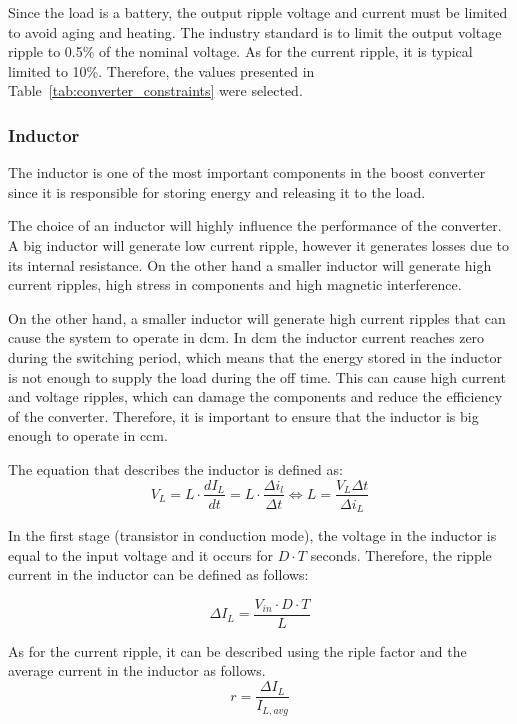 Since the load is a battery, the output ripple voltage and current must be limited to avoid aging and heating. The industry standard is to limit the output voltage ripple to 0.5\% of the nominal voltage. As for the current ripple, it is typical limited to 10\%. Therefore, the values presented in Table~\ref{tab:converter_constraints} were selected.

\subsubsection{Inductor}
The inductor is one of the most important components in the boost converter since it is responsible for storing energy and releasing it to the load. 

The choice of an inductor will highly influence the performance of the converter. A big inductor will generate low current ripple, however it generates losses due to its internal resistance. On the other hand a smaller inductor will generate high current ripples, high stress in components and high magnetic interference.

On the other hand, a smaller inductor will generate high current ripples that can cause the system to operate in \ac{dcm}. In \ac{dcm} the inductor current reaches zero during the switching period, which means that the energy stored in the inductor is not enough to supply the load during the off time. This can cause high current and voltage ripples, which can damage the components and reduce the efficiency of the converter. Therefore, it is important to ensure that the inductor is big enough to operate in \ac{ccm}.


The equation that describes the inductor is defined as:
\begin{equation}
    V_L = L \cdot \frac{dI_L}{dt} = L \cdot \frac{\Delta i_l}{\Delta t} \Leftrightarrow L = \frac{V_L \Delta t}{\Delta i_L}
    \label{eq:inductor1}
\end{equation}

In the first stage (transistor in conduction mode), the voltage in the inductor is equal to the input voltage and it occurs for $D \cdot T$ seconds. Therefore, the ripple current in the inductor can be defined as follows:

\begin{equation}
    \Delta I_L = \frac{V_{in} \cdot D \cdot T}{L}
\end{equation}

As for the current ripple, it can be described using the riple factor and the average current in the inductor as follows.
\begin{equation}
    r = \frac{\Delta I_L}{I_{L,avg}}
    \label{eq:riple factor}
\end{equation}

